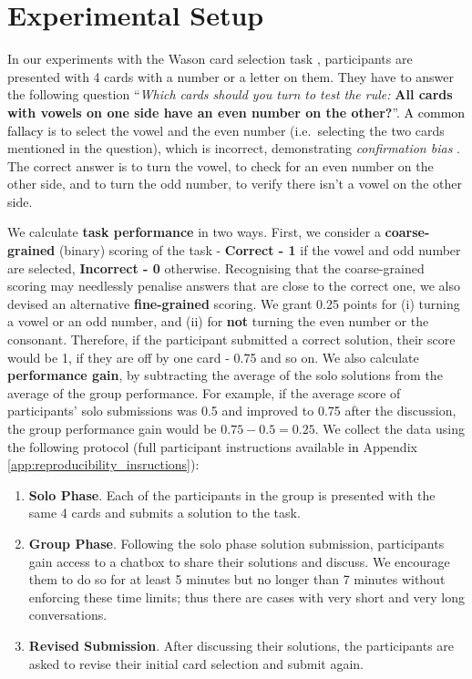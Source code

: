 \documentclass[acmsmall,manuscript,screen]{acmart}
\newcommand\newtext[1]{\textcolor{black}{#1}}
\begin{document}
\section{Experimental Setup}
\label{sec:experimental_setup}

In our experiments with the Wason card selection task \cite{wason1968reasoning}, participants are presented with 4 cards with a number or a letter on them. They have to answer the following question ``\textit{Which cards should you turn to test the rule:} \textbf{All cards with vowels on one side have an even number on the other?}''. \newtext{A common fallacy} is to 
select the vowel and the even number (i.e.\  selecting the two cards mentioned in the question), which is incorrect, demonstrating \textit{confirmation bias}  \citep{mercier2011humans}. The correct answer is to turn the vowel, to check for an even number on the other side, and to turn the odd number, to verify there isn't a vowel on the other side. \par
We calculate \textbf{task performance} in two ways. First, we consider a \textbf{coarse-grained} (binary) scoring of the task - \textbf{Correct - 1} if the vowel and odd number are selected, \textbf{Incorrect - 0} otherwise. Recognising that the coarse-grained scoring may needlessly penalise answers that are close to the correct one, we also devised an alternative \textbf{fine-grained} scoring. We grant 0.25 points for (i) turning a vowel or an odd number, and (ii) for \textbf{not} turning the even number or the consonant. Therefore, if the participant submitted a correct solution, their score would be 1, if they are off by one card - 0.75 and so on. We also calculate \textbf{performance gain}, by subtracting the average of the solo solutions from the average of the group performance. For example, if the average score of participants' solo submissions was 0.5 and 
improved to 0.75 after the discussion, the group performance gain would be $0.75 - 0.5 = 0.25$. 
We collect the data using the following protocol (full participant instructions available \newtext{in} Appendix \ref{app:reproducibility_insructions}):
\begin{enumerate}
\item \textbf{Solo Phase}. Each of the participants in the group is presented with the same 4 cards and submits a solution to the task.
\item \textbf{Group Phase}. Following the solo phase solution submission,
participants gain access to a chatbox to share their solutions and discuss. We encourage them to do so
for at least 5 minutes
but no longer than 7 minutes without enforcing these time limits; thus there are cases with very short and very long conversations. 
\item \textbf{Revised Submission}. After discussing their solutions, the participants are asked to revise their initial card selection and submit again. 
\end{enumerate}
\end{document}
